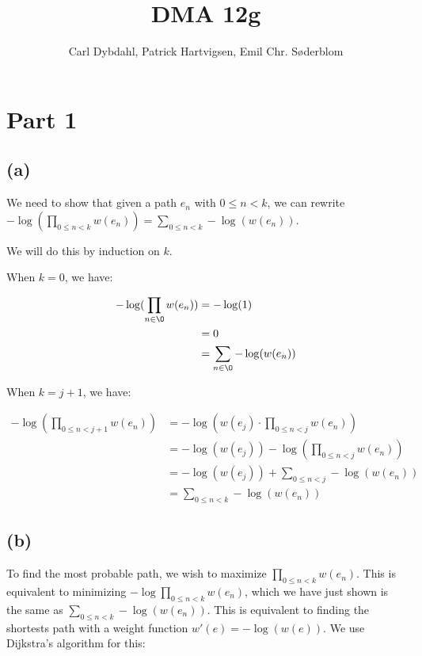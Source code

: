 \documentclass[a4paper]{article}
\title{DMA 12g}
\author{Carl Dybdahl, Patrick Hartvigsen, Emil Chr. Søderblom}
\begin{document}
\maketitle

\section*{Part 1}

\subsection*{(a)}

We need to show that given a path \(e_n\) with \(0 \le n < k\), we can rewrite \(-\log(\prod\limits_{0 \le n < k} w(e_n)) = \sum\limits_{0 \le n < k} - \log(w(e_n))\).

We will do this by induction on \(k\).

When \(k = 0\), we have:

\[
\begin{aligned}
-\log(\prod\limits_{n \in \O} w(e_n)) &= -\log(1) \\
&= 0 \\
&= \sum\limits_{n \in \O} - \log(w(e_n))
\end{aligned}
\]

When \(k = j + 1\), we have:

\[
\begin{aligned}
-\log(\prod\limits_{0 \le n < j + 1} w(e_n)) &=  -\log(w(e_j) \cdot \prod\limits_{0 \le n < j} w(e_n)) \\
&= -\log(w(e_j)) - \log(\prod\limits_{0 \le n < j} w(e_n)) \\
&= -\log(w(e_j)) + \sum\limits_{0 \le n < j} - \log(w(e_n)) \\
&= \sum\limits_{0 \le n < k} - \log(w(e_n))
\end{aligned}
\]

\subsection*{(b)}

To find the most probable path, we wish to maximize \(\prod\limits_{0 \le n < k} w(e_n)\). This is equivalent to minimizing \(- \log\prod\limits_{0 \le n < k} w(e_n)\), which we have just shown is the same as \(\sum\limits_{0 \le n < k} - \log(w(e_n))\). This is equivalent to finding the shortests path with a weight function \(w'(e) = -\log(w(e))\). We use Dijkstra's algorithm for this:
\end{document}
